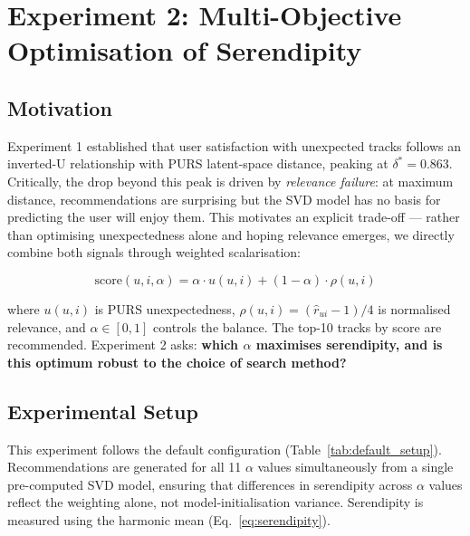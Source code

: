 
\section{Experiment 2: Multi-Objective Optimisation of Serendipity}
\label{sec:experiment2}

\subsection{Motivation}

Experiment 1 established that user satisfaction with unexpected tracks follows
an inverted-U relationship with PURS latent-space distance, peaking at
$\delta^* = 0.863$.  Critically, the drop beyond this peak is driven by
\emph{relevance failure}: at maximum distance, recommendations are surprising
but the SVD model has no basis for predicting the user will enjoy them.  This
motivates an explicit trade-off --- rather than optimising unexpectedness alone
and hoping relevance emerges, we directly combine both signals through weighted
scalarisation:

\begin{equation}
    \text{score}(u, i, \alpha)
    = \alpha \cdot u(u, i) + (1 - \alpha) \cdot \rho(u, i)
    \label{eq:scalarisation}
\end{equation}

where $u(u,i)$ is PURS unexpectedness, $\rho(u,i) = (\hat{r}_{ui}-1)/4$ is
normalised relevance, and $\alpha \in [0,1]$ controls the balance.  The
top-10 tracks by score are recommended.  Experiment 2 asks: \textbf{which
$\alpha$ maximises serendipity, and is this optimum robust to the choice of
search method?}

\subsection{Experimental Setup}

This experiment follows the default configuration
(Table~\ref{tab:default_setup}).  Recommendations are generated for all 11
$\alpha$ values simultaneously from a single pre-computed SVD model, ensuring
that differences in serendipity across $\alpha$ values reflect the weighting
alone, not model-initialisation variance.  Serendipity is measured using the
harmonic mean (Eq.~\ref{eq:serendipity}).

